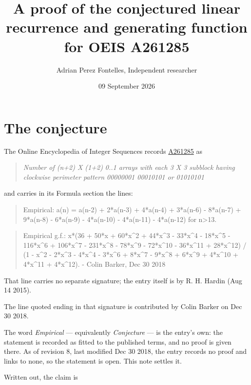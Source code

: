 \documentclass[11pt]{article}
\title{A proof of the conjectured linear recurrence and generating function for OEIS A261285}
\author{Adrian Perez Fontelles, Independent researcher}
\date{09 September 2026}
\theoremstyle{definition}
\begin{document}
\maketitle
\section{The conjecture}

The Online Encyclopedia of Integer Sequences records \href{https://oeis.org/A261285}{A261285} as

\begin{quote}\itshape Number of (n+2) X (1+2) 0..1 arrays with each 3 X 3 subblock having clockwise perimeter pattern 00000001 00010101 or 01010101\end{quote}

and carries in its Formula section the lines:

\begin{quote}\ttfamily Empirical: a(n) = a(n-2) + 2*a(n-3) + 4*a(n-4) + 3*a(n-6) - 8*a(n-7) + 9*a(n-8) - 6*a(n-9) - 4*a(n-10) - 4*a(n-11) - 4*a(n-12) for n>13.\end{quote}

\begin{quote}\ttfamily Empirical g.f.: x*(36 + 50*x + 60*x\textasciicircum{}2 + 44*x\textasciicircum{}3 - 33*x\textasciicircum{}4 - 18*x\textasciicircum{}5 - 116*x\textasciicircum{}6 + 106*x\textasciicircum{}7 - 231*x\textasciicircum{}8 - 78*x\textasciicircum{}9 - 72*x\textasciicircum{}10 - 36*x\textasciicircum{}11 + 28*x\textasciicircum{}12) / (1 - x\textasciicircum{}2 - 2*x\textasciicircum{}3 - 4*x\textasciicircum{}4 - 3*x\textasciicircum{}6 + 8*x\textasciicircum{}7 - 9*x\textasciicircum{}8 + 6*x\textasciicircum{}9 + 4*x\textasciicircum{}10 + 4*x\textasciicircum{}11 + 4*x\textasciicircum{}12). - Colin Barker, Dec 30 2018\end{quote}

That line carries no separate signature; the entry itself is by R. H. Hardin (Aug 14 2015).

The line quoted ending in that signature is contributed by Colin Barker on Dec 30 2018.

The word {\itshape Empirical} --- equivalently {\itshape Conjecture} --- is the entry's own: the statement is recorded as fitted to the published terms, and no proof is given there. As of revision 8, last modified Dec 30 2018, the entry records no proof and links to none, so the statement is open. This note settles it.

Written out, the claim is
\end{document}
